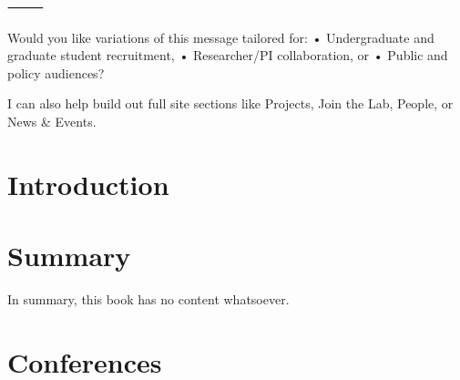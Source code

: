 \documentclass[
  letterpaper,
  DIV=11,
  numbers=noendperiod]{scrreprt}
\begin{document}
⸻

Would you like variations of this message tailored for: • Undergraduate
and graduate student recruitment, • Researcher/PI collaboration, or •
Public and policy audiences?

I can also help build out full site sections like Projects, Join the
Lab, People, or News \& Events.


\chapter{Introduction}\label{introduction}


\chapter{Summary}\label{summary}

In summary, this book has no content whatsoever.


\chapter{Conferences}\label{conferences}
\end{document}
